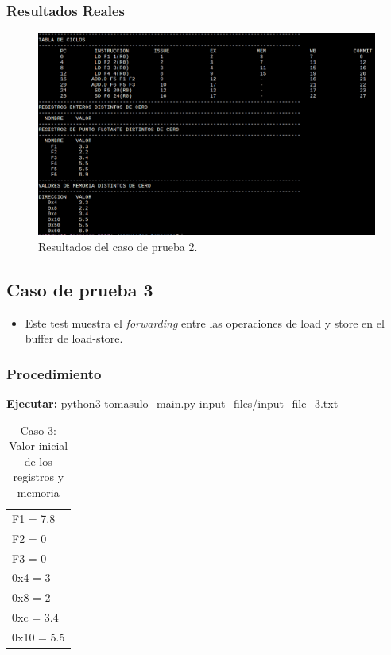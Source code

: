 \documentclass[a4paper]{article}
\begin{document}
	\subsubsection*{Resultados Reales}

	\begin{figure}[H]
	\centering
	\includegraphics[width=1\textwidth]{figures/test2.png}
	\caption{\label{fig:bloques}Resultados del caso de prueba 2.}
	\end{figure}


	\subsection*{Caso de prueba 3}

	\begin{itemize}
		\item Este test muestra el \textit{forwarding} entre las operaciones de load y store en el buffer de load-store.
	\end{itemize}

	\subsubsection*{Procedimiento}

	\textbf{Ejecutar:} python3 tomasulo\_main.py input\_files/input\_file\_3.txt

	\begin{table}[H]
		\centering
		\caption*{Caso 3: Valor inicial de los registros y memoria}
		\begin{tabular}{l}
			F1 = 7.8 \\
			F2 = 0 \\
			F3 = 0 \\
			0x4 = 3 \\
			0x8 = 2 \\
			0xc = 3.4 \\
			0x10 = 5.5
		\end{tabular}
	\end{table}
\end{document}
